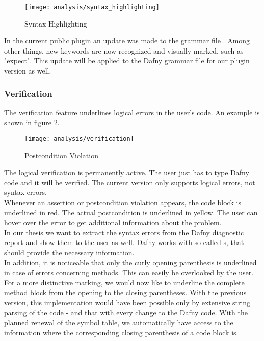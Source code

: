 \begin{figure}[H]
    \centering
    \texttt{[image: analysis/syntax\_highlighting]}
    \caption{Syntax Highlighting}
    \label{fig:analysis_syntax_highlighting}
\end{figure}

In the current public plugin an update was made to the grammar file \cite{syntax_update}.
Among other things, new keywords are now recognized and visually marked, such as "expect".
This update will be applied to the Dafny grammar file for our plugin version as well.

\subsubsection{Verification}
The verification feature underlines logical errors in the user's code.
An example is shown in figure \ref{fig:analysis_verification}.

\begin{figure}[H]
    \centering
    \texttt{[image: analysis/verification]}
    \caption{Postcondition Violation}
    \label{fig:analysis_verification}
\end{figure}

The logical verification is permanently active.
The user just has to type Dafny code and it will be verified.
The current version only supports logical errors, not syntax errors.\\

Whenever an assertion or postcondition violation appears, the code block is underlined in red.
The actual postcondition is underlined in yellow.
The user can hover over the error to get additional information about the problem. \\

In our thesis we want to extract the syntax errors from the Dafny diagnostic report and show them to the user as well.
Dafny works with so called s, that should provide the necessary information.\\

In addition, it is noticeable that only the curly opening parenthesis is underlined in case of errors concerning methods.
This can easily be overlooked by the user.
For a more distinctive marking, we would now like to underline the complete method block from the opening to the closing parentheses.
With the previous version, this implementation would have been possible only by extensive string parsing of the code - and that with every change to the Dafny code.
With the planned renewal of the symbol table, we automatically have access to the information where the corresponding closing parenthesis of a code block is.

